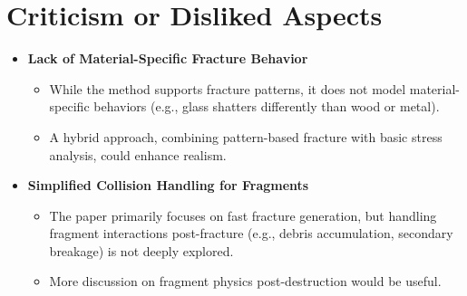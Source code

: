 \documentclass[12pt]{article}
\begin{document}
\section{Criticism or Disliked Aspects}
\begin{itemize}[noitemsep]
    \item \textbf{Lack of Material-Specific Fracture Behavior}
    \begin{itemize}[noitemsep]
        \item While the method supports fracture patterns, it does not model material-specific behaviors (e.g., glass shatters differently than wood or metal).
        \item A hybrid approach, combining pattern-based fracture with basic stress analysis, could enhance realism.
    \end{itemize}
    \item \textbf{Simplified Collision Handling for Fragments}
    \begin{itemize}[noitemsep]
        \item The paper primarily focuses on fast fracture generation, but handling fragment interactions post-fracture (e.g., debris accumulation, secondary breakage) is not deeply explored.
        \item More discussion on fragment physics post-destruction would be useful.
    \end{itemize}
\end{itemize}
\end{document}
